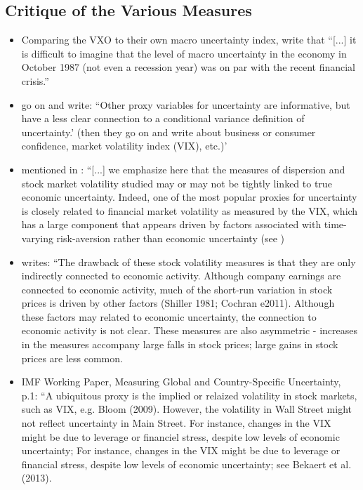 \documentclass[a4paper,11pt,listof=nochaptergap,oneside,pointednumbers,bibtotoc,bigheadings,liststotoc]{scrbook}
\begin{document}
\subsection{Critique of the Various Measures}
\begin{itemize}
	\item Comparing the VXO to their own macro uncertainty index, \citet[p. 1201]{juradoetal:15} write that ``[...] it is difficult to imagine that the level of macro uncertainty in the economy in October 1987 (not even a recession year) was on par with the recent financial crisis.''
	\item \citet{orlikandveldkamp:14} go on and write: ``Other proxy variables for uncertainty are informative, but have a less clear connection to a conditional variance definition of uncertainty.' (then they go on and write about business or consumer confidence, market volatility index (VIX), etc.)'
	\item mentioned in \citet[p. 1182]{juradoetal:15}: ``[...] we emphasize here that the measures of dispersion and stock market volatility studied may or may not be tightly linked to true economic uncertainty. Indeed, one of the most popular proxies for uncertainty is closely related to financial market volatility as measured by the VIX, which has a large component that appears driven by factors associated with time-varying risk-aversion rather than economic uncertainty (see \citet{bekaertetal:13}) 
	\item \citet[p. 4]{moore:17} writes: ``The drawback of these stock volatility measures is that they are only indirectly connected to economic activity. Although company earnings are connected to economic activity, much of the short-run variation in stock prices is driven by other factors (Shiller 1981; Cochran e2011). Although these factors may related to economic uncertainty, the connection to economic activity is not clear. These measures are also asymmetric - increases in the measures accompany large falls in stock prices; large gains in stock prices are less common.
	\item IMF Working Paper, Measuring Global and Country-Specific Uncertainty, p.1: ``A ubiquitous proxy is the implied or relaized volatility in stock markets, such as VIX, e.g. Bloom (2009). However, the volatility in Wall Street might not reflect uncertainty in Main Street. For instance, changes in the VIX might be due to leverage or financiel stress, despite low levels of economic uncertainty; For instance, changes in the VIX might be due to leverage or financial stress, despite low levels of economic uncertainty; see Bekaert et al. (2013).

\end{itemize}
\end{document}
